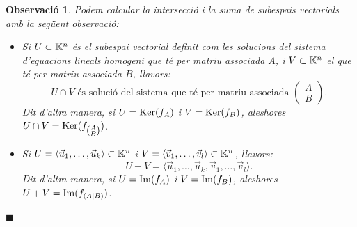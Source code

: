 \documentclass[
  11pt,
]{book}
\numberwithin{dummy}{section}
\theoremstyle{maincolornumbox}
\newtheorem{remarkT}{Observació}[chapter]
\theoremstyle{blacknumex}
\theoremstyle{blacknumbox}
\theoremstyle{maincolornum}
\newenvironment{remark}{\begin{remarkT}}{\hfill{\tiny\ensuremath{\blacksquare}}\end{remarkT}}
\newlength\esp
\begin{document}
\begin{remark}

Podem calcular la intersecció i la suma de subespais vectorials amb la
següent observació:

\begin{itemize}
\item
  Si \(U\subset \mathbb{K}^n\) és el subespai vectorial definit com les
  solucions del sistema d'equacions lineals homogeni que té per matriu
  associada \(A\), i \(V\subset \mathbb{K}^n\) el que té per matriu associada \(B\),
  llavors:
  \[U \cap V \text{ és solució del sistema que té per matriu associada } \begin{pmatrix}
          A \\ B
          \end{pmatrix}.\] Dit d'altra manera, si \(U = \operatorname{Ker}(f_A)\) i
  \(V=\operatorname{Ker}(f_B)\), aleshores
  \(U\cap V = \operatorname{Ker}(f_{\left(\substack{A\\B}\right)})\).
\item
  Si \(U=\langle \vec u_1, \dots, \vec u_k \rangle \subset \mathbb{K}^n\) i
  \(V=\langle \vec v_1, \dots, \vec v_l \rangle \subset \mathbb{K}^n\), llavors:
  \[U+V=\langle \vec u_1, \dots, \vec u_k, \vec v_1, \dots, \vec v_l \rangle .\]
  Dit d'altra manera, si \(U = \operatorname{Im}(f_A)\) i \(V=\operatorname{Im}(f_B)\), aleshores
  \(U+V = \operatorname{Im}(f_{(A|B)})\).
\end{itemize}

\end{remark}
\end{document}
